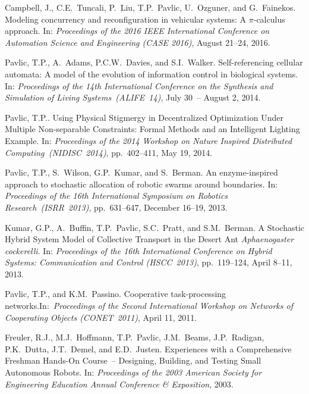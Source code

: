 \documentclass[10pt]{article}
\begin{document}
\begin{bibenum}
    \item Campbell, J., C.E.~Tuncali, P.~Liu, T.P.~Pavlic, U.~Ozguner,
        and G.~Fainekos. Modeling concurrency and reconfiguration in
        vehicular systems: A $\pi$-calculus approach. In:
        \emph{Proceedings of the 2016 IEEE International Conference on
        Automation Science and Engineering (CASE 2016)}, August 21--24,
        2016.\\

    \item Pavlic, T.P., A.~Adams, P.C.W.~Davies, and S.I.~Walker.
        Self-referencing cellular automata: A model of the evolution of
        information control in biological systems.
        In: \emph{Proceedings of the 14th International Conference on
        the Synthesis and Simulation of Living Systems~(ALIFE~14)},
        July 30~-- August 2, 2014.\\

    \item Pavlic, T.P.. Using Physical Stigmergy in Decentralized
        Optimization Under Multiple Non-separable Constraints: Formal
        Methods and an Intelligent Lighting Example. In:
        \emph{Proceedings of the 2014 Workshop on Nature Inspired
        Distributed Computing~(NIDISC~2014)}, pp.~402--411, May 19, 2014.

    \item Pavlic, T.P., S.~Wilson, G.P.~Kumar, and S.~Berman.
        An enzyme-inspired approach to stochastic allocation of robotic
        swarms around boundaries. In: \emph{Proceedings of the 16th
        International Symposium on Robotics Research~(ISRR~2013)},
        pp.~631--647, December 16--19, 2013.

    \item Kumar, G.P., A.~Buffin, T.P.~Pavlic, S.C.~Pratt, and
        S.M.~Berman. A Stochastic Hybrid System Model of Collective
        Transport in the Desert Ant \emph{Aphaenogaster cockerelli}. In:
        \emph{Proceedings of the 16th International Conference on Hybrid
        Systems: Communication and Control (HSCC~2013)}, pp.~119--124,
        April 8--11, 2013. 

    \item Pavlic, T.P., and K.M.~Passino. Cooperative task-processing
        networks.\linebreak[4] In:~\emph{Proceedings of the Second
        International Workshop on Networks of Cooperating
        Objects (CONET~2011)}, April 11, 2011.

    \item Freuler, R.J., M.J.~Hoffmann, T.P.~Pavlic, J.M.~Beams,
        J.P.~Radigan, P.K.~Dutta, J.T.~Demel, and E.D.~Justen.
        Experiences with a Comprehensive Freshman Hands-On Course~--
        Designing, Building, and Testing Small Autonomous Robots. In:
        \emph{Proceedings of the 2003 American Society for Engineering
        Education Annual Conference \& Exposition}, 2003.

\end{bibenum}
\end{document}
